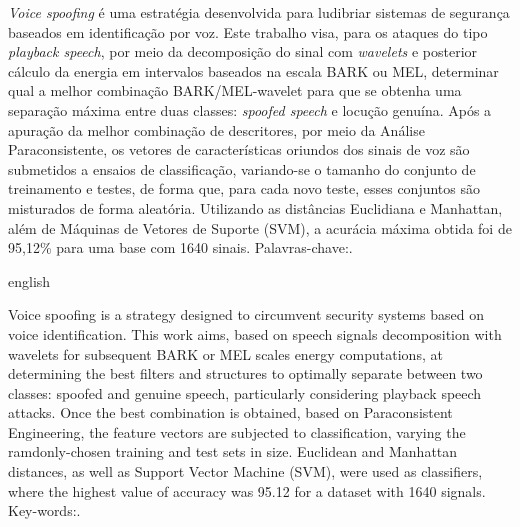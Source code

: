 \begin{resumo}
	\par \textit{Voice spoofing} é uma estratégia desenvolvida para ludibriar sistemas de segurança baseados em identificação por voz. Este trabalho visa, para os ataques do tipo \textit{playback speech}, por meio da decomposição do sinal com \textit{wavelets} e posterior cálculo da energia em intervalos baseados na escala BARK ou MEL, determinar qual a melhor combinação BARK/MEL-wavelet para que se obtenha uma separação máxima entre duas classes: \textit{spoofed speech} e locução genuína. Após a apuração da melhor combinação de descritores, por meio da Análise Paraconsistente, os vetores de características oriundos dos sinais de voz são submetidos a ensaios de classificação, variando-se o tamanho do conjunto de treinamento e testes, de forma que, para cada novo teste, esses conjuntos são misturados de forma aleatória. Utilizando as distâncias Euclidiana e Manhattan, além de Máquinas de Vetores de Suporte (SVM), a acurácia máxima obtida foi de 95,12\% para uma base com 1640 sinais.\newline\newline
	Palavras-chave:\ptBRkeyWords.
\end{resumo}

\begin{resumo}[Abstract]
	\begin{otherlanguage*}{english}
		\par Voice spoofing is a strategy designed to circumvent security systems based on voice identification. This work aims, based on speech signals decomposition with wavelets for subsequent BARK or MEL scales energy computations, at determining the best filters and structures to optimally separate between two classes: spoofed and genuine speech, particularly considering playback speech attacks. Once the best combination is obtained, based on Paraconsistent Engineering, the feature vectors are subjected to classification, varying the ramdonly-chosen training and test sets in size. Euclidean and Manhattan distances, as well as Support Vector Machine (SVM), were used as classifiers, where the highest value of accuracy was 95.12 for a dataset with 1640 signals.\newline\newline
		Key-words:\enUSkeyWords .
	 \end{otherlanguage*}
\end{resumo}






